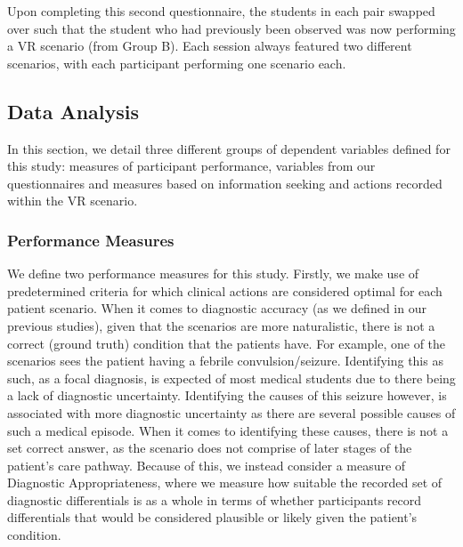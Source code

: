 \documentclass[a4paper, nobind]{templates/ociamthesis}
\begin{document}
Upon completing this second questionnaire, the students in each pair swapped over such that the student who had previously been observed was now performing a VR scenario (from Group B). Each session always featured two different scenarios, with each participant performing one scenario each.

\subsection{Data Analysis}\label{data-analysis}

In this section, we detail three different groups of dependent variables defined for this study: measures of participant performance, variables from our questionnaires and measures based on information seeking and actions recorded within the VR scenario.

\subsubsection{Performance Measures}\label{performance-measures}

We define two performance measures for this study. Firstly, we make use of predetermined criteria for which clinical actions are considered optimal for each patient scenario. When it comes to diagnostic accuracy (as we defined in our previous studies), given that the scenarios are more naturalistic, there is not a correct (ground truth) condition that the patients have. For example, one of the scenarios sees the patient having a febrile convulsion/seizure. Identifying this as such, as a focal diagnosis, is expected of most medical students due to there being a lack of diagnostic uncertainty. Identifying the causes of this seizure however, is associated with more diagnostic uncertainty as there are several possible causes of such a medical episode. When it comes to identifying these causes, there is not a set correct answer, as the scenario does not comprise of later stages of the patient's care pathway. Because of this, we instead consider a measure of Diagnostic Appropriateness, where we measure how suitable the recorded set of diagnostic differentials is as a whole in terms of whether participants record differentials that would be considered plausible or likely given the patient's condition.
\end{document}
